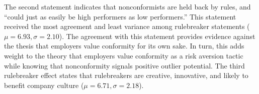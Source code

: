 \documentclass[review]{elsarticle}
\begin{document}
The second statement indicates that nonconformists are held back by rules,
and ``could just as easily be high performers as low performers.''
This statement received the most agreement and least variance among rulebreaker statements ($\mu = 6.93, \sigma = 2.10$).
The agreement with this statement provides evidence against the thesis that employers value conformity for its own sake.
In turn, this adds weight to the theory that employers value conformity as a risk aversion tactic while knowing that nonconformity signals positive outlier potential.
The third rulebreaker effect states that rulebreakers are creative, innovative, and likely to benefit company culture ($\mu = 6.71, \sigma = 2.18$).

\end{document}
